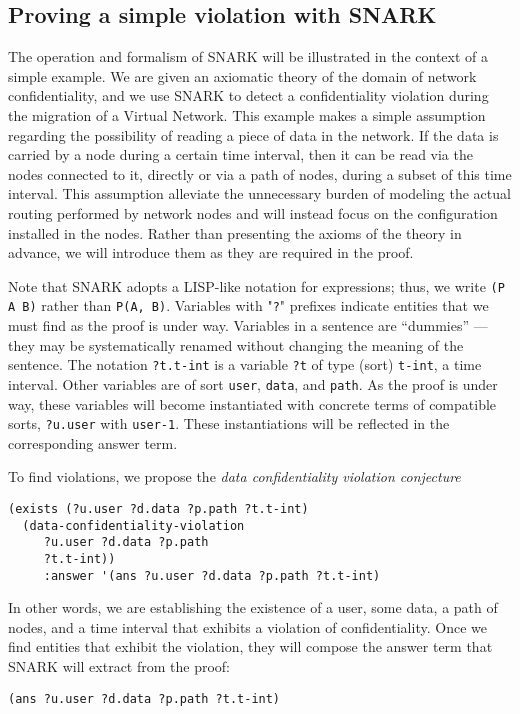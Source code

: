 \subsection{Proving a simple violation with SNARK}
\label{sec:find-violation}
The operation and formalism of SNARK will be illustrated in the context of a simple example.
We are given an axiomatic theory of the domain of network confidentiality, and we use SNARK to detect a confidentiality violation during the migration of a Virtual Network.
This example makes a simple assumption regarding the possibility of reading a piece of data in the network. If the data is carried by a node during a certain time interval, then it can be read via the nodes connected to it, directly or via a path of nodes, during a subset of this time interval.
This assumption alleviate the unnecessary burden of modeling the actual routing performed by network nodes and will instead focus on the configuration installed in the nodes.
Rather than presenting the axioms of the theory in advance, we will introduce them as they are required in the proof.

Note that SNARK adopts a LISP-like notation for expressions; thus, we write \verb'(P A B)' rather than \verb'P(A, B)'. 
Variables with "\verb'?'" prefixes indicate entities that we must find as the proof is under way.
Variables in a sentence are ``dummies'' \---- they may be systematically renamed without changing the meaning of the sentence. 
The notation \verb'?t.t-int' is a variable \verb'?t' of type (sort) \verb't-int', \ie a time interval. 
Other variables are of sort \verb'user', \verb'data', and \verb'path'.
As the proof is under way, these variables will become instantiated with concrete terms of compatible sorts, \eg \verb'?u.user' with \verb'user-1'. 
These instantiations will be reflected in the corresponding answer term.

To find violations, we propose the \textit{data confidentiality violation conjecture}

\begin{lstlisting}[numbers=none] 
(exists (?u.user ?d.data ?p.path ?t.t-int)
  (data-confidentiality-violation 
     ?u.user ?d.data ?p.path 
     ?t.t-int))
     :answer '(ans ?u.user ?d.data ?p.path ?t.t-int)
\end{lstlisting}

In other words, we are establishing the existence of  a user, some data, a path of nodes, and a time interval that exhibits a violation of confidentiality. 
Once we find entities that exhibit the violation, they will compose the answer term that SNARK will extract from the proof:  
  \begin{lstlisting}[numbers=none] 
     (ans ?u.user ?d.data ?p.path ?t.t-int)
  \end{lstlisting}


